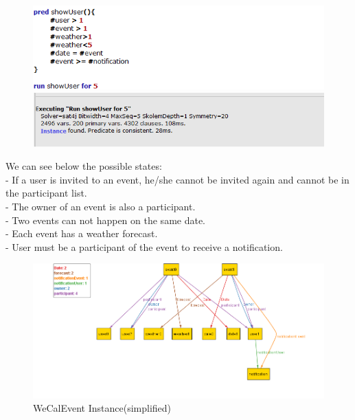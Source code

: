 \begin{figure}[tbh]
  \includegraphics[width=180mm]{run}
  \includegraphics[width=180mm]{Alt1}

\end{figure}




\newpage

 We can see below the possible states:\\
 - If a user is invited to an event, he/she cannot be invited again and cannot be in the participant list.\\
 - The owner of an event is also a participant.\\
 - Two events can not happen on the same date.\\
 - Each event has a weather forecast.\\
 - User must be a participant of the event to receive a notification.\\



\begin{figure}[tbh]
  \begin{center}
  \includegraphics[width=180mm]{simplified}
    \caption{WeCalEvent Instance(simplified)}\label{Fig :}
  \end{center}
\end{figure}

